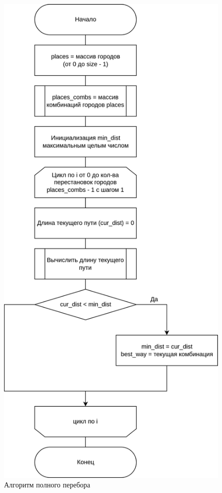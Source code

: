 \begin{figure}[h]
	\centering
	\includegraphics[height=0.65\textheight]{imgs/full.drawio}
	\caption{Алгоритм полного перебора}
	\label{fig:full-comb}
\end{figure}

